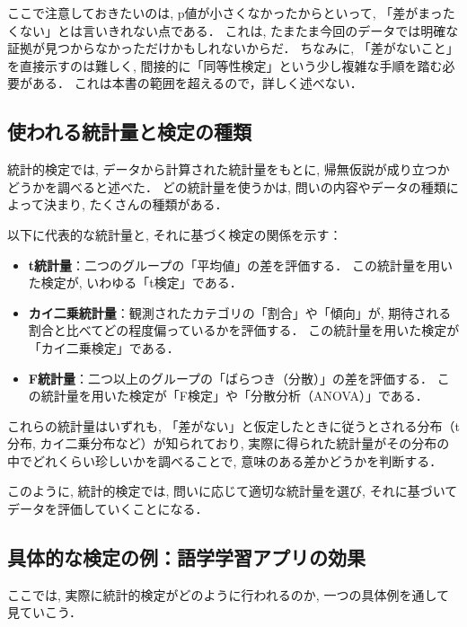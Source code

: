     
    ここで注意しておきたいのは, p値が小さくなかったからといって, 「差がまったくない」とは言いきれない点である．
    これは, たまたま今回のデータでは明確な証拠が見つからなかっただけかもしれないからだ．
    ちなみに, 「差がないこと」を直接示すのは難しく, 
    間接的に「同等性検定」という少し複雑な手順を踏む必要がある．
    これは本書の範囲を超えるので，詳しく述べない．


  \subsection{使われる統計量と検定の種類}

    統計的検定では, データから計算された統計量をもとに,
    帰無仮説が成り立つかどうかを調べると述べた．
    どの統計量を使うかは, 問いの内容やデータの種類によって決まり, たくさんの種類がある．
  
    以下に代表的な統計量と, それに基づく検定の関係を示す：
  
    \begin{itemize}
      \item \textbf{t統計量}：\quad 二つのグループの「平均値」の差を評価する．  
        この統計量を用いた検定が, いわゆる「t検定」である．
  
      \item \textbf{カイ二乗統計量}：\quad 観測されたカテゴリの「割合」や「傾向」が,
        期待される割合と比べてどの程度偏っているかを評価する．  
        この統計量を用いた検定が「カイ二乗検定」である．
  
      \item \textbf{F統計量}：\quad 二つ以上のグループの「ばらつき（分散）」の差を評価する．  
        この統計量を用いた検定が「F検定」や「分散分析（ANOVA）」である．
    \end{itemize}
  
    これらの統計量はいずれも,
    「差がない」と仮定したときに従うとされる分布（t分布, カイ二乗分布など）が知られており,
    実際に得られた統計量がその分布の中でどれくらい珍しいかを調べることで,
    意味のある差かどうかを判断する．
  
    このように, 統計的検定では, 
    問いに応じて適切な統計量を選び,
    それに基づいてデータを評価していくことになる．


  \subsection{具体的な検定の例：語学学習アプリの効果}
    ここでは, 実際に統計的検定がどのように行われるのか,
    一つの具体例を通して見ていこう．
    
